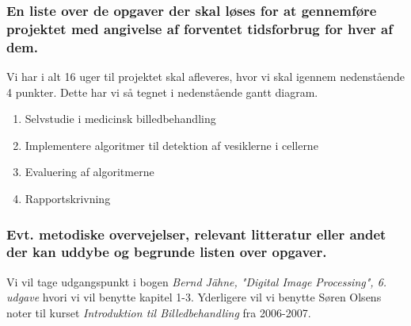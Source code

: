 \subsubsection*{En liste over de opgaver der skal løses for at gennemføre projektet med angivelse af forventet tidsforbrug for hver af dem. }
Vi har i alt 16 uger til projektet skal afleveres, hvor vi skal igennem nedenstående 4 punkter. Dette har vi så tegnet i nedenstående gantt diagram.
\begin{enumerate}
	\item Selvstudie i medicinsk billedbehandling
	\item Implementere algoritmer til detektion af vesiklerne i cellerne
	\item Evaluering af algoritmerne
	\item Rapportskrivning
\end{enumerate}
\begin{gantt}{5}{16}
    \begin{ganttitle}
    \end{ganttitle}
\end{gantt}

% 

\subsubsection*{Evt. metodiske overvejelser, relevant litteratur eller andet der kan uddybe og begrunde listen over opgaver.}
Vi vil tage udgangspunkt i bogen \emph{Bernd Jähne, "Digital Image Processing", 6. udgave} hvori vi vil benytte kapitel 1-3. Yderligere vil vi benytte Søren Olsens noter til kurset \emph{Introduktion til Billedbehandling} fra 2006-2007.

